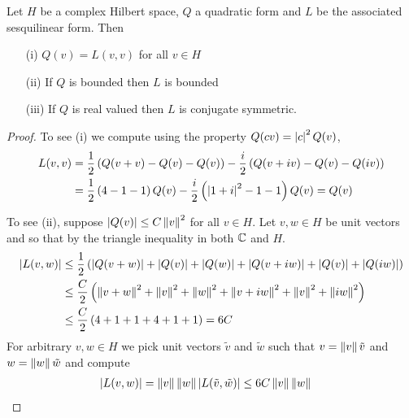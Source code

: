 \begin{prop}\label{hilbert:QuadraticPropertiesToSesquilinearProperties}Let $H$ be a complex Hilbert space, $Q$ a quadratic form and $L$ be the associated sesquilinear form.  Then
\begin{itemize}
\item[(i)] $Q(v) = L(v,v)$ for all $v \in H$
\item[(ii)] If $Q$ is bounded then $L$ is bounded
\item[(iii)] If $Q$ is real valued then $L$ is conjugate symmetric.
\end{itemize}
\end{prop}
\begin{proof}
To see (i) we compute using the property $Q(c v) = \left \vert c \right \vert^2 Q(v)$,
\begin{align*}
L(v,v) &= \frac{1}{2} \left ( Q(v+v) - Q(v) - Q(v) \right) - \frac{i}{2} \left (Q(v+iv) - Q(v) - Q(iv) \right)  \\
&= \frac{1}{2} \left ( 4 - 1 -1 \right)  Q(v) -  \frac{i}{2} \left ( \left \vert 1+i \right \vert^2 - 1 - 1 \right)  Q(v)  = Q(v)
\end{align*}

To see (ii), suppose $\left \vert Q(v) \right \vert \leq C \left \lVert v \right \rVert^2$ for all $v \in H$.  Let $v, w \in H$ be unit vectors and so that by the triangle inequality in both $\mathbb{C}$ and $H$.
\begin{align*}
\left \vert L(v,w) \right \vert &\leq \frac{1}{2} \left(\left \vert Q(v+w) \right \vert + \left \vert Q(v) \right \vert + \left \vert Q(w) \right \vert + \left \vert Q(v+iw) \right \vert + \left \vert Q(v) \right \vert + \left \vert Q(iw) \right \vert \right) \\
&\leq \frac{C}{2} \left( \left \lVert v+w \right \rVert^2 + \left \lVert v \right \rVert^2 + \left \lVert w \right \rVert^2 + \left \lVert v+iw \right \rVert^2 + \left \lVert v \right \rVert^2 + \left \lVert iw \right \rVert^2 \right ) \\
&\leq \frac{C}{2} \left( 4 + 1 + 1 + 4 + 1 + 1 \right ) = 6 C
\end{align*}
For arbitrary $v,w \in H$ we pick unit vectors $\tilde{v}$ and $\tilde{w}$ such that  $v = \left \lVert v \right \rVert \tilde{v}$ and $w = \left \lVert w \right \rVert \tilde{w}$ and compute
\begin{align*}
\left \vert L(v,w) \right \vert &= \left \lVert v \right \rVert \left \lVert w \right \rVert \left \vert L(\tilde{v}, \tilde{w}) \right \vert \leq 6C \left \lVert v \right \rVert \left \lVert w \right \rVert 
\end{align*}


\end{proof}
